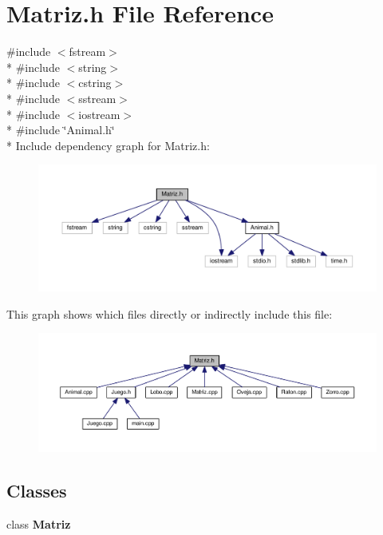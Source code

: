 \section{Matriz.\-h File Reference}
\label{_matriz_8h}
{\ttfamily \#include $<$fstream$>$}\\*
{\ttfamily \#include $<$string$>$}\\*
{\ttfamily \#include $<$cstring$>$}\\*
{\ttfamily \#include $<$sstream$>$}\\*
{\ttfamily \#include $<$iostream$>$}\\*
{\ttfamily \#include \char`\"{}Animal.\-h\char`\"{}}\\*
Include dependency graph for Matriz.\-h\-:
\nopagebreak
\begin{figure}[H]
\begin{center}
\leavevmode
\includegraphics[width=350pt]{_matriz_8h__incl}
\end{center}
\end{figure}
This graph shows which files directly or indirectly include this file\-:
\nopagebreak
\begin{figure}[H]
\begin{center}
\leavevmode
\includegraphics[width=350pt]{_matriz_8h__dep__incl}
\end{center}
\end{figure}
\subsection*{Classes}
\begin{DoxyCompactItemize}
\item 
class {\bf Matriz}
\end{DoxyCompactItemize}
